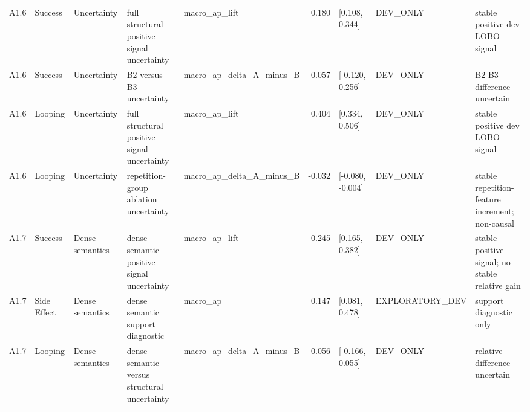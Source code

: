 \begin{table}[t]
\begin{tabular}{llp{}p{}p{}rp{}p{}p{}}
A1.6 & Success & Uncertainty & full structural positive-signal uncertainty & macro\_ap\_lift & 0.180 & [0.108, 0.344] & DEV\_ONLY & stable positive dev LOBO signal \\
A1.6 & Success & Uncertainty & B2 versus B3 uncertainty & macro\_ap\_delta\_A\_minus\_B & 0.057 & [-0.120, 0.256] & DEV\_ONLY & B2-B3 difference uncertain \\
A1.6 & Looping & Uncertainty & full structural positive-signal uncertainty & macro\_ap\_lift & 0.404 & [0.334, 0.506] & DEV\_ONLY & stable positive dev LOBO signal \\
A1.6 & Looping & Uncertainty & repetition-group ablation uncertainty & macro\_ap\_delta\_A\_minus\_B & -0.032 & [-0.080, -0.004] & DEV\_ONLY & stable repetition-feature increment; non-causal \\
A1.7 & Success & Dense semantics & dense semantic positive-signal uncertainty & macro\_ap\_lift & 0.245 & [0.165, 0.382] & DEV\_ONLY & stable positive signal; no stable relative gain \\
A1.7 & Side Effect & Dense semantics & dense semantic support diagnostic & macro\_ap & 0.147 & [0.081, 0.478] & EXPLORATORY\_DEV & support diagnostic only \\
A1.7 & Looping & Dense semantics & dense semantic versus structural uncertainty & macro\_ap\_delta\_A\_minus\_B & -0.056 & [-0.166, 0.055] & DEV\_ONLY & relative difference uncertain \\
\hline
\end{tabular}
\end{table}
